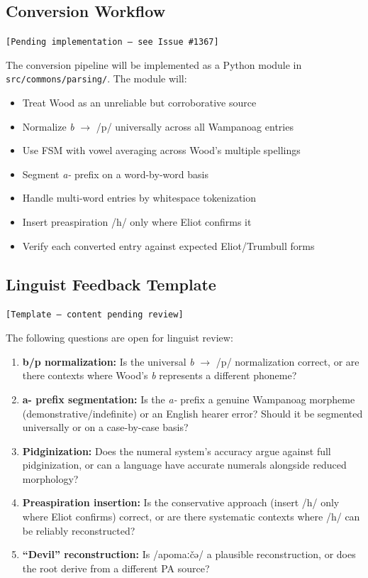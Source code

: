 \subsection{Conversion Workflow}
\texttt{[Pending implementation --- see Issue \#1367]}

The conversion pipeline will be implemented as a Python module in
\texttt{src/commons/parsing/}. The module will:

\begin{itemize}
  \item Treat Wood as an unreliable but corroborative source
  \item Normalize \emph{b} $\rightarrow$ /p/ universally across all Wampanoag
    entries
  \item Use FSM with vowel averaging across Wood's multiple spellings
  \item Segment \emph{a-} prefix on a word-by-word basis
  \item Handle multi-word entries by whitespace tokenization
  \item Insert preaspiration /h/ only where Eliot confirms it
  \item Verify each converted entry against expected Eliot/Trumbull forms
\end{itemize}

\subsection{Linguist Feedback Template}

\texttt{[Template --- content pending review]}

The following questions are open for linguist review:

\begin{enumerate}
  \item \textbf{b/p normalization:} Is the universal \emph{b} $\rightarrow$
    /p/ normalization correct, or are there contexts where Wood's \emph{b}
    represents a different phoneme?
  \item \textbf{a- prefix segmentation:} Is the \emph{a-} prefix a genuine
    Wampanoag morpheme (demonstrative/indefinite) or an English hearer error?
    Should it be segmented universally or on a case-by-case basis?
  \item \textbf{Pidginization:} Does the numeral system's accuracy argue against
    full pidginization, or can a language have accurate numerals alongside
    reduced morphology?
  \item \textbf{Preaspiration insertion:} Is the conservative approach (insert
    /h/ only where Eliot confirms) correct, or are there systematic contexts
    where /h/ can be reliably reconstructed?
  \item \textbf{``Devil'' reconstruction:} Is /apomaːčə/ a plausible
    reconstruction, or does the root derive from a different PA source?
\end{enumerate}

